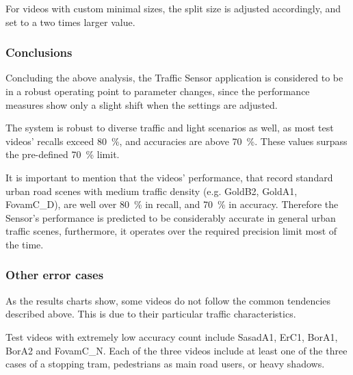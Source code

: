For videos with custom minimal sizes, the split size is adjusted accordingly, and set to a two times larger value.

\subsubsection{Conclusions}
Concluding the above analysis, the Traffic Sensor application is considered to be in a robust operating point to parameter changes, since the performance measures show only a slight shift when the settings are adjusted.

The system is robust to diverse traffic and light scenarios as well, as most test videos' recalls exceed \SI{80}{\%}, and accuracies are above \SI{70}{\%}. These values surpass the pre-defined \SI{70}{\%} limit.

It is important to mention that the videos' performance, that record standard urban road scenes with medium traffic density (e.g. GoldB2, GoldA1, FovamC\_D), are well over \SI{80}{\%} in recall, and \SI{70}{\%} in accuracy.
Therefore the Sensor's performance is predicted to be considerably accurate in general urban traffic scenes, furthermore, it operates over the required precision limit most of the time.

\subsubsection{Other error cases}
As the results charts show, some videos do not follow the common tendencies described above.
This is due to their particular traffic characteristics.

Test videos with extremely low accuracy count include SasadA1, ErC1, BorA1, BorA2 and FovamC\_N.
Each of the three videos include at least one of the three cases of a stopping tram, pedestrians as main road users, or heavy shadows.

